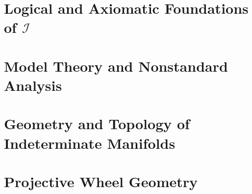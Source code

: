 \documentclass[12pt,a4paper,twoside,openright]{book}
\theoremstyle{definition}
\theoremstyle{remark}
\newcommand{\I}{\mathcal{I}}
\begin{document}
\mainmatter

\part{Logical and Axiomatic Foundations of $\I$}
\label{part:foundations}


















\part{Model Theory and Nonstandard Analysis}
\label{part:model-theory}






\part{Geometry and Topology of Indeterminate Manifolds}
\label{part:geometry}






\part{Projective Wheel Geometry}
\label{part:wheel}




\end{document}
